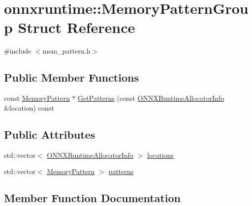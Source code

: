 \hypertarget{structonnxruntime_1_1MemoryPatternGroup}{}\section{onnxruntime\+:\+:Memory\+Pattern\+Group Struct Reference}
\label{structonnxruntime_1_1MemoryPatternGroup}


{\ttfamily \#include $<$mem\+\_\+pattern.\+h$>$}

\subsection*{Public Member Functions}
\begin{DoxyCompactItemize}
\item 
const \mbox{\hyperlink{classonnxruntime_1_1MemoryPattern}{Memory\+Pattern}} $\ast$ \mbox{\hyperlink{structonnxruntime_1_1MemoryPatternGroup_a7a8289350432eff55d6a6ae5c2f4b5d1}{Get\+Patterns}} (const \mbox{\hyperlink{structONNXRuntimeAllocatorInfo}{O\+N\+N\+X\+Runtime\+Allocator\+Info}} \&location) const
\end{DoxyCompactItemize}
\subsection*{Public Attributes}
\begin{DoxyCompactItemize}
\item 
std\+::vector$<$ \mbox{\hyperlink{structONNXRuntimeAllocatorInfo}{O\+N\+N\+X\+Runtime\+Allocator\+Info}} $>$ \mbox{\hyperlink{structonnxruntime_1_1MemoryPatternGroup_ab34bfa6208cbe546b8d93c1a16744940}{locations}}
\item 
std\+::vector$<$ \mbox{\hyperlink{classonnxruntime_1_1MemoryPattern}{Memory\+Pattern}} $>$ \mbox{\hyperlink{structonnxruntime_1_1MemoryPatternGroup_ad0f2349aae2299f7673e9f5fe3359e1d}{patterns}}
\end{DoxyCompactItemize}


\subsection{Member Function Documentation}
\mbox{\label{structonnxruntime_1_1MemoryPatternGroup_a7a8289350432eff55d6a6ae5c2f4b5d1}} 
